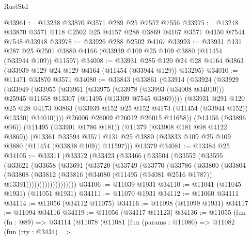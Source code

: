 \begin{lexlean}{RustStd}
\begin{coremodule}
@33961 := @13238 @33870 @3571 @289 @25 @7552 @7556
@33975 := @13248 @33870 @3571 @118 @2502 @25 @4157 @288 @3869 @4167 @3571 @4150 @7544 @7548 @33948
@33978 := @33926 @288 @2502 @4167
@33993 := @33931
    @131
    @287
    @25
    @2501
    @3880
    @4166
    (@33939 @109 @25 @109 @3880 (@11454 (@33944 @109)) @11597)
@34008 := @33931
    @285
    @120
    @24
    @28
    @4164
    @3863
    (@33939 @129 @24 @129 @4164 (@11454 (@33944 @129)) @13295)
@34010 := @11471 @33870 @3571
@34080 := @33843
    (@33861
      (@33914
        (@33924
          (@33929
            (@33949
              (@33955
                (@33961
                  (@33975
                    (@33978 (@33993 (@34008 @34010)))
                    @25945
                    @11658
                    @13307
                    (@11495 (@13309 @7545 @3869))))
                (@33931
                  @291
                  @120
                  @25
                  @28
                  @4173
                  @3863
                  (@33939 @152 @25 @152 @4173 (@11454 (@33944 @152)) @13330)
                  @34010))))
          @26006
          @26009
          @26012
          @26015
          @11658))
      (@13156 (@33896 @96))
      (@11495 (@33901 @1786 @181))
      (@11379 (@33908 @181 @98 @4122 @3869))
      (@13361
        @33594
        @3571
        @131
        @25
        @3880
        (@33833 @109 @25 @109 @3880 (@11454 (@33838 @109)) @11597)))
    @13379
@34081 := @13384 @25
@34105 := @33311
    (@33372
      (@33423
        (@33466
          (@33504
            (@33552
              (@33595
                (@33621
                  (@33658
                    (@33691
                      (@33720
                        (@33749
                          (@33770
                            (@33786
                              (@33800
                                (@33804
                                  (@33808
                                    (@33812
                                      (@33816
                                        (@34080
                                          (@11495 (@34081 @2516 @1787))
                                          @13391)))))))))))))))))))
@34106 := @11039 @1931
@34110 := @11041 (@11045 @1931) (@11051 @1931)
@34111 := @11070 @1931
@34112 := @11060 @34111
@34114 := @11056 (@34112 @11075)
@34116 := @11098 (@11099 @1931)
@34117 := @11094 @34116
@34119 := @11056 (@34117 @11123)
@34136 := @11055
    (fun (fn : @89) =>
    @34114
      (@11078
        (@11081
          (fun (params : @11080) =>
          @11082
            (fun (rty : @3434) =>

\end{coremodule}
\end{lexlean}

